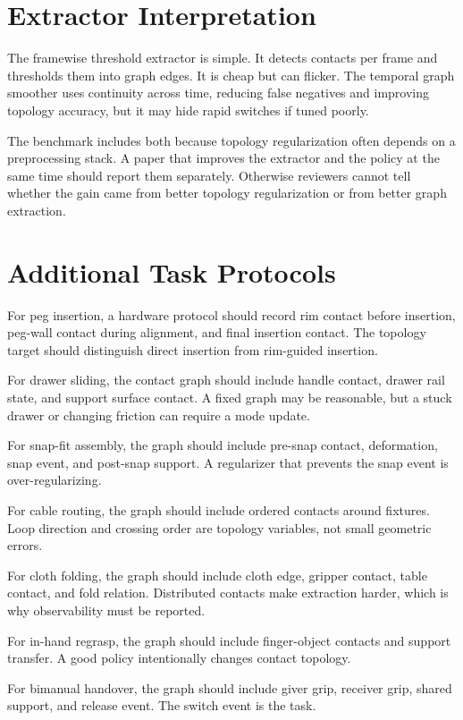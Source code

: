 \documentclass{article}
\begin{document}
\section{Extractor Interpretation}

The framewise threshold extractor is simple. It detects contacts per frame and thresholds them into graph edges. It is cheap but can flicker. The temporal graph smoother uses continuity across time, reducing false negatives and improving topology accuracy, but it may hide rapid switches if tuned poorly.

The benchmark includes both because topology regularization often depends on a preprocessing stack. A paper that improves the extractor and the policy at the same time should report them separately. Otherwise reviewers cannot tell whether the gain came from better topology regularization or from better graph extraction.

\section{Additional Task Protocols}

For peg insertion, a hardware protocol should record rim contact before insertion, peg-wall contact during alignment, and final insertion contact. The topology target should distinguish direct insertion from rim-guided insertion.

For drawer sliding, the contact graph should include handle contact, drawer rail state, and support surface contact. A fixed graph may be reasonable, but a stuck drawer or changing friction can require a mode update.

For snap-fit assembly, the graph should include pre-snap contact, deformation, snap event, and post-snap support. A regularizer that prevents the snap event is over-regularizing.

For cable routing, the graph should include ordered contacts around fixtures. Loop direction and crossing order are topology variables, not small geometric errors.

For cloth folding, the graph should include cloth edge, gripper contact, table contact, and fold relation. Distributed contacts make extraction harder, which is why observability must be reported.

For in-hand regrasp, the graph should include finger-object contacts and support transfer. A good policy intentionally changes contact topology.

For bimanual handover, the graph should include giver grip, receiver grip, shared support, and release event. The switch event is the task.
\end{document}
